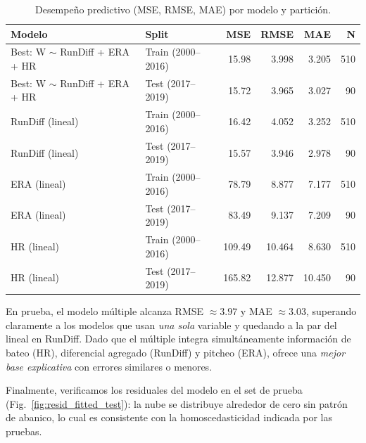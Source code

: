 \documentclass[man,floatsintext]{apa7}
\begin{document}
\begin{table}[H]
    \centering
    \caption{Desempeño predictivo (MSE, RMSE, MAE) por modelo y partición.}
    \label{tab:forecast_metrics}
    \begin{tabular}{l l r r r r}
        \toprule
        Modelo & Split & MSE & RMSE & MAE & N \\
        \midrule
        Best: W $\sim$ RunDiff + ERA + HR & Train (2000--2016) & 15.98 & 3.998 & 3.205 & 510 \\
        Best: W $\sim$ RunDiff + ERA + HR & Test (2017--2019)  & 15.72 & 3.965 & 3.027 &  90 \\
        RunDiff (lineal)                   & Train (2000--2016) & 16.42 & 4.052 & 3.252 & 510 \\
        RunDiff (lineal)                   & Test (2017--2019)  & 15.57 & 3.946 & 2.978 &  90 \\
        ERA (lineal)                       & Train (2000--2016) & 78.79 & 8.877 & 7.177 & 510 \\
        ERA (lineal)                       & Test (2017--2019)  & 83.49 & 9.137 & 7.209 &  90 \\
        HR (lineal)                        & Train (2000--2016) &109.49 &10.464 & 8.630 & 510 \\
        HR (lineal)                        & Test (2017--2019)  &165.82 &12.877 &10.450 &  90 \\
        \bottomrule
    \end{tabular}
\end{table}

En prueba, el modelo múltiple alcanza RMSE $\approx 3.97$ y MAE $\approx 3.03$, superando claramente a los modelos que usan \emph{una sola} variable y quedando a la par del lineal en RunDiff. Dado que el múltiple integra simultáneamente información de bateo (HR), diferencial agregado (RunDiff) y pitcheo (ERA), ofrece una \emph{mejor base explicativa} con errores similares o menores.

Finalmente, verificamos los residuales del modelo en el set de prueba (Fig.~\ref{fig:resid_fitted_test}): la nube se distribuye alrededor de cero sin patrón de abanico, lo cual es consistente con la homoscedasticidad indicada por las pruebas.
\end{document}

